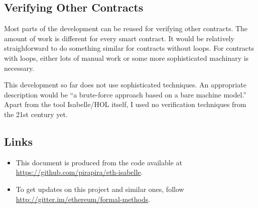 \documentclass[11pt,a4paper]{article}
\begin{document}
\subsection{Verifying Other Contracts}

Most parts of the development can be reused for verifying other contracts.
The amount of work is
different for every smart contract.  It would be relatively
straighforward to do something similar for
contracts without loops.  For contracts with loops,
either lots of manual work or some more
sophisticated machinary is necessary.

This development so far does not use sophisticated techniques.
An appropriate description would be ``a brute-force approach based on a bare machine model.''
Apart from the tool Isabelle/HOL itself, I used no verification techniques from the 21st century yet.

\subsection{Links}

\begin{itemize}
\item This document is produced from the code available at
\url{https://github.com/pirapira/eth-isabelle}.
\item To get updates on this project and similar ones, follow \url{http://gitter.im/ethereum/formal-methods}.
\end{itemize}



%
%
\end{document}
